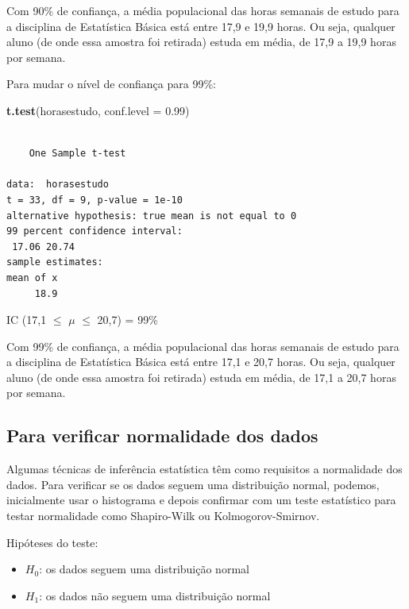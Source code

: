 \documentclass[12pt,brazil,oneside]{book}
\newenvironment{Shaded}{\begin{snugshade}}{\end{snugshade}}
\newcommand{\DataTypeTok}[1]{\textcolor[rgb]{0.13,0.29,0.53}{#1}}
\newcommand{\FloatTok}[1]{\textcolor[rgb]{0.00,0.00,0.81}{#1}}
\newcommand{\KeywordTok}[1]{\textcolor[rgb]{0.13,0.29,0.53}{\textbf{#1}}}
\newcommand{\NormalTok}[1]{#1}
\providecommand{\tightlist}{%
  \setlength{\itemsep}{0pt}\setlength{\parskip}{0pt}}
\begin{document}
Com 90\% de confiança, a média populacional das horas semanais de estudo para a disciplina de Estatística Básica está entre 17,9 e 19,9 horas. Ou seja, qualquer aluno (de onde essa amostra foi retirada) estuda em média, de 17,9 a 19,9 horas por semana.

Para mudar o nível de confiança para 99\%:

\begin{Shaded}
\begin{Highlighting}[]
\KeywordTok{t.test}\NormalTok{(horasestudo, }\DataTypeTok{conf.level =} \FloatTok{0.99}\NormalTok{)}
\end{Highlighting}
\end{Shaded}

\begin{verbatim}

    One Sample t-test

data:  horasestudo
t = 33, df = 9, p-value = 1e-10
alternative hypothesis: true mean is not equal to 0
99 percent confidence interval:
 17.06 20.74
sample estimates:
mean of x 
     18.9 
\end{verbatim}

IC (17,1 \(\leq\) \(\mu\) \(\leq\) 20,7) = 99\%

Com 99\% de confiança, a média populacional das horas semanais de estudo para a disciplina de Estatística Básica está entre 17,1 e 20,7 horas. Ou seja, qualquer aluno (de onde essa amostra foi retirada) estuda em média, de 17,1 a 20,7 horas por semana.

\hypertarget{para-verificar-normalidade-dos-dados}{%
\subsection{Para verificar normalidade dos dados}\label{para-verificar-normalidade-dos-dados}}

Algumas técnicas de inferência estatística têm como requisitos a normalidade dos dados. Para verificar se os dados seguem uma distribuição normal, podemos, inicialmente usar o histograma e depois confirmar com um teste estatístico para testar normalidade como Shapiro-Wilk ou Kolmogorov-Smirnov.

Hipóteses do teste:

\begin{itemize}
\tightlist
\item
  \textbf{\(H_0\)}: os dados seguem uma distribuição normal
\item
  \textbf{\(H_1\)}: os dados não seguem uma distribuição normal
\end{itemize}
\end{document}
